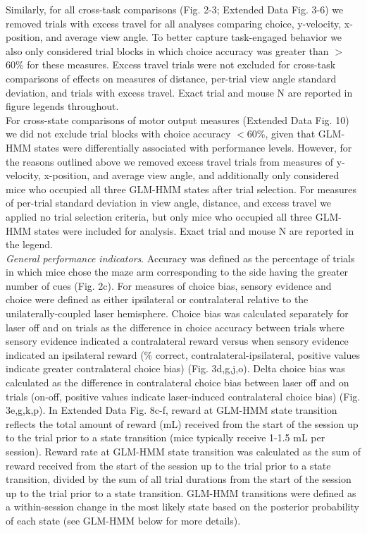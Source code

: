 Similarly, for all cross-task comparisons (Fig. 2-3; Extended Data Fig. 3-6) we removed trials with excess travel for all analyses comparing choice, y-velocity, x-position, and average view angle. To better capture task-engaged behavior we also only considered trial blocks in which choice accuracy was greater than $>$60\% for these measures. Excess travel trials were not excluded for cross-task comparisons of effects on measures of distance, per-trial view angle standard deviation, and trials with excess travel. Exact trial and mouse N are reported in figure legends throughout. \\
For cross-state comparisons of motor output measures (Extended Data Fig. 10) we did not exclude trial blocks with choice accuracy $<$60\%, given that GLM-HMM states were differentially associated with performance levels. However, for the reasons outlined above we removed excess travel trials from measures of y-velocity, x-position, and average view angle, and additionally only considered mice who occupied all three GLM-HMM states after trial selection. For measures of per-trial standard deviation in view angle, distance, and excess travel we applied no trial selection criteria, but only mice who occupied all three GLM-HMM states were included for analysis. Exact trial and mouse N are reported in the legend. \\
\textit{General performance indicators}. Accuracy was defined as the percentage of trials in which mice chose the maze arm corresponding to the side having the greater number of cues (Fig. 2c). For measures of choice bias, sensory evidence and choice were defined as either ipsilateral or contralateral relative to the unilaterally-coupled laser hemisphere. Choice bias was calculated separately for laser off and on trials as the difference in choice accuracy between trials where sensory evidence indicated a contralateral reward versus when sensory evidence indicated an ipsilateral reward (\% correct, contralateral-ipsilateral, positive values indicate greater contralateral choice bias) (Fig. 3d,g,j,o). Delta choice bias was calculated as the difference in contralateral choice bias between laser off and on trials (on-off, positive values indicate laser-induced contralateral choice bias) (Fig. 3e,g,k,p). In Extended Data Fig. 8c-f, reward at GLM-HMM state transition reflects the total amount of reward (mL) received from the start of the session up to the trial prior to a state transition (mice typically receive 1-1.5 mL per session). Reward rate at GLM-HMM state transition was calculated as the sum of reward received from the start of the session up to the trial prior to a state transition, divided by the sum of all trial durations from the start of the session up to the trial prior to a state transition. GLM-HMM transitions were defined as a within-session change in the most likely state based on the posterior probability of each state (see GLM-HMM below for more details). \\
